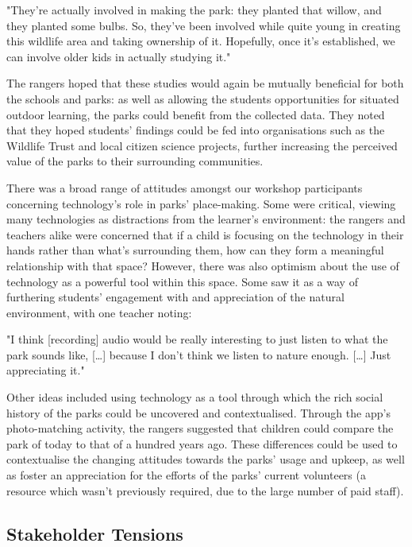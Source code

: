 \begin{displayquote}
"They're actually involved in making the park: they planted that willow, and they planted some bulbs. So, they've been involved while quite young in creating this wildlife area and taking ownership of it. Hopefully, once it's established, we can involve older kids in actually studying it."
\end{displayquote}

The rangers hoped that these studies would again be mutually beneficial for both the schools and parks: as well as allowing the students opportunities for situated outdoor learning, the parks could benefit from the collected data. They noted that they hoped students’ findings could be fed into organisations such as the Wildlife Trust and local citizen science projects, further increasing the perceived value of the parks to their surrounding communities.

There was a broad range of attitudes amongst our workshop participants concerning technology’s role in parks’ place-making. Some were critical, viewing many technologies as distractions from the learner’s environment: the rangers and teachers alike were concerned that if a child is focusing on the technology in their hands rather than what’s surrounding them, how can they form a meaningful relationship with that space? However, there was also optimism about the use of technology as a powerful tool within this space. Some saw it as a way of furthering students’ engagement with and appreciation of the natural environment, with one teacher noting:

\begin{displayquote}
"I think [recording] audio would be really interesting to just listen to what the park sounds like, […] because I don't think we listen to nature enough. […] Just appreciating it."
\end{displayquote}

Other ideas included using technology as a tool through which the rich social history of the parks could be uncovered and contextualised. Through the app’s photo-matching activity, the rangers suggested that children could compare the park of today to that of a hundred years ago. These differences could be used to contextualise the changing attitudes towards the parks’ usage and upkeep, as well as foster an appreciation for the efforts of the parks’ current volunteers (a resource which wasn't previously required, due to the large number of paid staff).

\subsection{Stakeholder Tensions}

